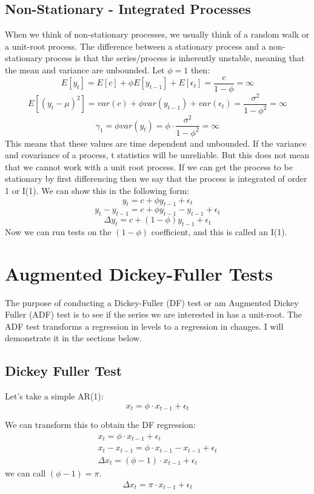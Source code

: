 \documentclass[12pt,letter]{article}
\begin{document}
\subsection{Non-Stationary - Integrated Processes}

When we think of non-stationary processes, we usually think of a random walk or a unit-root process. The difference between a stationary process and a non-stationary process is that the series/process is inherently unstable, meaning that the mean and variance are unbounded. Let $\phi=1$ then:\\
$$ E[y_{t}] = E[c] + \phi E[y_{t-1}] + E[\epsilon_{t}] = \frac{c}{1-\phi}= \infty$$
$$ E[(y_{t}-\mu)^{2}]= var(c) + \phi var(y_{t-1}) + var(\epsilon_{t}) = \frac{\sigma^{2}}{1- \phi^{2}}= \infty$$
$$ \gamma_{1}=\phi var(y_{t}) = \phi \cdot \frac{\sigma^{2}}{1- \phi^{2}}= \infty$$
This means that these values are time dependent and unbounded. If the variance and covariance of a process, t statistics will be unreliable. But this does not mean that we cannot work with a unit root process. If we can get the process to be stationary by first differencing then we say that the process is integrated of order 1 or I(1). We can show this in the following form:
$$ y_{t}= c+ \phi y_{t-1} + \epsilon_{t}$$
$$y_{t}-y_{t-1} = c + \phi y_{t-1} -y_{t-1} + \epsilon_{t}$$
$$\Delta y_{t} = c + (1-\phi) y_{t-1} + \epsilon_{t}$$
Now we can run tests on the $(1-\phi)$ coefficient, and this is called an I(1).



\section{Augmented Dickey-Fuller Tests}
The purpose of conducting a Dickey-Fuller (DF) test or am Augmented Dickey Fuller (ADF) test is to see if the series we are interested in has a unit-root. The ADF test transforms a regression in levels to a regression in changes. I will demonstrate it in the sections below.
\subsection{Dickey Fuller Test}
Let's take a simple AR(1):$$ x_{t}= \phi \cdot x_{t-1} + \epsilon_{t}$$

We can transform this to obtain the DF regression:
\begin{align*}
x_{t}=\phi \cdot x_{t-1} + \epsilon_{t}\\
x_{t}-x_{t-1}= \phi \cdot x_{t-1} - x_{t-1} + \epsilon_{t}\\
\Delta x_{t}= (\phi-1) \cdot x_{t-1} + \epsilon_{t}
\end{align*} 
we can call $(\phi-1) = \pi$.
\begin{align*}
\Delta x_{t}= \pi \cdot x_{t-1} + \epsilon_{t}
\end{align*}
\end{document}
